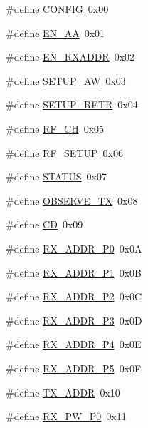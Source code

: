 \begin{DoxyCompactItemize}
\item 
\#define \hyperlink{a00013_a76ea3cf49247a07c54b3db005a3c7f57}{C\-O\-N\-F\-I\-G}~0x00
\item 
\#define \hyperlink{a00013_aa84a282351a2c9b83dd653df6ac59216}{E\-N\-\_\-\-A\-A}~0x01
\item 
\#define \hyperlink{a00013_ab6b2378ce9cab6ccafb6d30c774c5307}{E\-N\-\_\-\-R\-X\-A\-D\-D\-R}~0x02
\item 
\#define \hyperlink{a00013_af5ef355ba3eca336db1285cab353ddc2}{S\-E\-T\-U\-P\-\_\-\-A\-W}~0x03
\item 
\#define \hyperlink{a00013_a2188309b3eceeae158dd64109cd919aa}{S\-E\-T\-U\-P\-\_\-\-R\-E\-T\-R}~0x04
\item 
\#define \hyperlink{a00013_a5c4da84e4a01531aa9f5c3e617848d66}{R\-F\-\_\-\-C\-H}~0x05
\item 
\#define \hyperlink{a00013_ad95edb7665f39454d7d7fd436301712b}{R\-F\-\_\-\-S\-E\-T\-U\-P}~0x06
\item 
\#define \hyperlink{a00013_a59279bee44f34d08b3cbf3a89fb0d8d9}{S\-T\-A\-T\-U\-S}~0x07
\item 
\#define \hyperlink{a00013_a491468eaa7f2db84c152709b0b5fb1aa}{O\-B\-S\-E\-R\-V\-E\-\_\-\-T\-X}~0x08
\item 
\#define \hyperlink{a00013_a1050140a3d78b059f809a424e0d9e1c7}{C\-D}~0x09
\item 
\#define \hyperlink{a00013_adc82a1b0dee303d8b783b9b9a89ae5aa}{R\-X\-\_\-\-A\-D\-D\-R\-\_\-\-P0}~0x0\-A
\item 
\#define \hyperlink{a00013_ad4b44f18e4b27b07af84783d8f11726d}{R\-X\-\_\-\-A\-D\-D\-R\-\_\-\-P1}~0x0\-B
\item 
\#define \hyperlink{a00013_ac10ad4b1d3ace06cc269098d1863f411}{R\-X\-\_\-\-A\-D\-D\-R\-\_\-\-P2}~0x0\-C
\item 
\#define \hyperlink{a00013_a01228e7b997954bc9d715c8289731181}{R\-X\-\_\-\-A\-D\-D\-R\-\_\-\-P3}~0x0\-D
\item 
\#define \hyperlink{a00013_afc579afe21136cd3f72b3ac805086726}{R\-X\-\_\-\-A\-D\-D\-R\-\_\-\-P4}~0x0\-E
\item 
\#define \hyperlink{a00013_a49dfc07335896551e8c7797594658b07}{R\-X\-\_\-\-A\-D\-D\-R\-\_\-\-P5}~0x0\-F
\item 
\#define \hyperlink{a00013_aa734c6e08b9f794436eacbabe466a6c4}{T\-X\-\_\-\-A\-D\-D\-R}~0x10
\item 
\#define \hyperlink{a00013_a060e61d8f6e7ad28984540faa85cdecf}{R\-X\-\_\-\-P\-W\-\_\-\-P0}~0x11

\end{DoxyCompactItemize}
